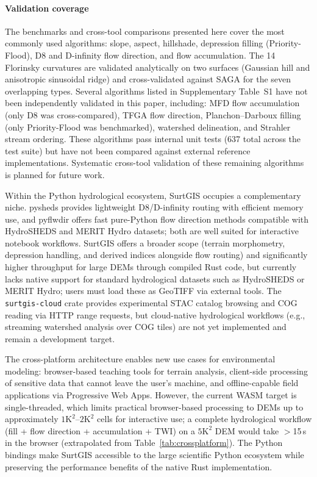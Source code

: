 \documentclass[preprint,review,12pt,authoryear]{elsarticle}
\begin{document}
\paragraph{Validation coverage} The benchmarks and cross-tool comparisons presented here cover the most commonly used algorithms: slope, aspect, hillshade, depression filling (Priority-Flood), D8 and D-infinity flow direction, and flow accumulation. The 14 Florinsky curvatures are validated analytically on two surfaces (Gaussian hill and anisotropic sinusoidal ridge) and cross-validated against SAGA for the seven overlapping types. Several algorithms listed in Supplementary Table~S1 have not been independently validated in this paper, including: MFD flow accumulation (only D8 was cross-compared), TFGA flow direction, Planchon--Darboux filling (only Priority-Flood was benchmarked), watershed delineation, and Strahler stream ordering. These algorithms pass internal unit tests (637 total across the test suite) but have not been compared against external reference implementations. Systematic cross-tool validation of these remaining algorithms is planned for future work.

Within the Python hydrological ecosystem, SurtGIS occupies a complementary niche. pysheds \citep{bartos2020pysheds} provides lightweight D8/D-infinity routing with efficient memory use, and pyflwdir \citep{eilander2021pyflwdir} offers fast pure-Python flow direction methods compatible with HydroSHEDS and MERIT Hydro datasets; both are well suited for interactive notebook workflows. SurtGIS offers a broader scope (terrain morphometry, depression handling, and derived indices alongside flow routing) and significantly higher throughput for large DEMs through compiled Rust code, but currently lacks native support for standard hydrological datasets such as HydroSHEDS or MERIT Hydro; users must load these as GeoTIFF via external tools. The \texttt{surtgis-cloud} crate provides experimental STAC catalog browsing and COG reading via HTTP range requests, but cloud-native hydrological workflows (e.g., streaming watershed analysis over COG tiles) are not yet implemented and remain a development target.

The cross-platform architecture enables new use cases for environmental modeling: browser-based teaching tools for terrain analysis, client-side processing of sensitive data that cannot leave the user's machine, and offline-capable field applications via Progressive Web Apps. However, the current WASM target is single-threaded, which limits practical browser-based processing to DEMs up to approximately $1\text{K}^2$--$2\text{K}^2$ cells for interactive use; a complete hydrological workflow (fill + flow direction + accumulation + TWI) on a $5\text{K}^2$ DEM would take $>$15\,s in the browser (extrapolated from Table~\ref{tab:crossplatform}). The Python bindings make SurtGIS accessible to the large scientific Python ecosystem while preserving the performance benefits of the native Rust implementation.
\end{document}
